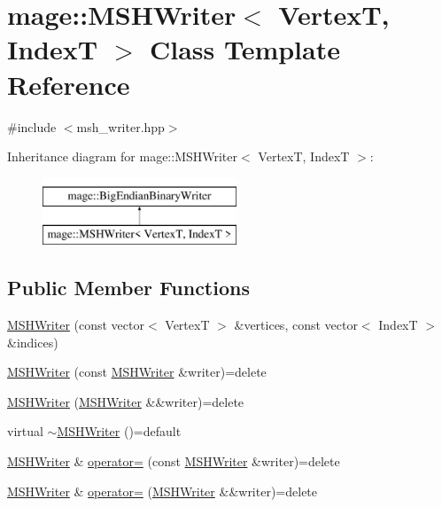 \hypertarget{classmage_1_1_m_s_h_writer}{}\section{mage\+:\+:M\+S\+H\+Writer$<$ VertexT, IndexT $>$ Class Template Reference}
\label{classmage_1_1_m_s_h_writer}


{\ttfamily \#include $<$msh\+\_\+writer.\+hpp$>$}

Inheritance diagram for mage\+:\+:M\+S\+H\+Writer$<$ VertexT, IndexT $>$\+:\begin{figure}[H]
\begin{center}
\leavevmode
\includegraphics[height=2.000000cm]{classmage_1_1_m_s_h_writer}
\end{center}
\end{figure}
\subsection*{Public Member Functions}
\begin{DoxyCompactItemize}
\item 
\hyperlink{classmage_1_1_m_s_h_writer_a4b74333888706ab61c9d6c3b6fefd4c5}{M\+S\+H\+Writer} (const vector$<$ VertexT $>$ \&vertices, const vector$<$ IndexT $>$ \&indices)
\item 
\hyperlink{classmage_1_1_m_s_h_writer_a19c63d56f07d30b8741e899ba81b0c70}{M\+S\+H\+Writer} (const \hyperlink{classmage_1_1_m_s_h_writer}{M\+S\+H\+Writer} \&writer)=delete
\item 
\hyperlink{classmage_1_1_m_s_h_writer_a35475ef50054a431e5f271221cb29753}{M\+S\+H\+Writer} (\hyperlink{classmage_1_1_m_s_h_writer}{M\+S\+H\+Writer} \&\&writer)=delete
\item 
virtual \hyperlink{classmage_1_1_m_s_h_writer_a8ab2e05e9fce4e02f1f1a3117dfb0062}{$\sim$\+M\+S\+H\+Writer} ()=default
\item 
\hyperlink{classmage_1_1_m_s_h_writer}{M\+S\+H\+Writer} \& \hyperlink{classmage_1_1_m_s_h_writer_a0c4f9bbd4a62ef60a38b7a75eb21ea26}{operator=} (const \hyperlink{classmage_1_1_m_s_h_writer}{M\+S\+H\+Writer} \&writer)=delete
\item 
\hyperlink{classmage_1_1_m_s_h_writer}{M\+S\+H\+Writer} \& \hyperlink{classmage_1_1_m_s_h_writer_ad8c9302c6335684ea28d4e47c81a1afb}{operator=} (\hyperlink{classmage_1_1_m_s_h_writer}{M\+S\+H\+Writer} \&\&writer)=delete
\end{DoxyCompactItemize}
